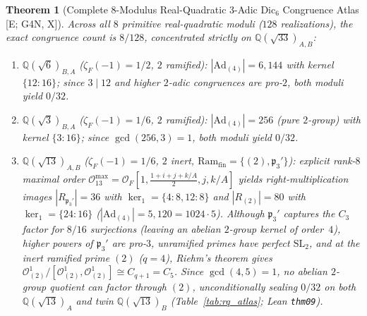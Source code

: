 \documentclass[11pt]{amsart}
\numberwithin{equation}{section}
\theoremstyle{plain}
\newtheorem{theorem}{Theorem}[section]
\theoremstyle{definition}\newtheorem{definition}[theorem]{Definition}
\theoremstyle{remark}\newtheorem{remark}[theorem]{Remark}
\newcommand{\Q}{\mathbb{Q}}
\newcommand{\calO}{\mathcal{O}}
\newcommand{\frp}{\mathfrak{p}}
\newcommand{\SL}{\mathrm{SL}}
\newcommand{\Dic}{\mathrm{Dic}}
\newcommand{\Ad}{\mathrm{Ad}}
\newcommand{\Ram}{\mathrm{Ram}}
\newcommand{\ctag}[1]{\textup{\textsf{\scriptsize[#1]}}}
\begin{document}
\begin{theorem}[Complete $8$-Modulus Real-Quadratic $3$-Adic $\Dic_6$ Congruence Atlas \ctag{E; G4N, X}]\label{thm:rq_atlas}
Across all $8$ primitive real-quadratic moduli ($128$ realizations), the exact congruence count is \textbf{$8/128$}, concentrated strictly on $\Q(\sqrt{33})_{A,B}$:
\begin{enumerate}[label=(\roman*),nosep]
\item $\Q(\sqrt{6})_{B,A}$ ($\zeta_F(-1)=1/2$, $2$ ramified): $|\Ad_{(4)}|=6{,}144$ with kernel $\{12{:}16\}$; since $3 \mid 12$ and higher $2$-adic congruences are pro-$2$, both moduli yield $0/32$.
\item $\Q(\sqrt{3})_{B,A}$ ($\zeta_F(-1)=1/6$, $2$ ramified): $|\Ad_{(4)}|=256$ (pure $2$-group) with kernel $\{3{:}16\}$; since $\gcd(256,3)=1$, both moduli yield $0/32$.
\item $\Q(\sqrt{13})_{A,B}$ ($\zeta_F(-1)=1/6$, $2$ inert, $\Ram_{\mathrm{fin}}=\{(2),\frp_3'\}$): explicit rank-$8$ maximal order $\calO_{13}^{\max} = \calO_F[1, \tfrac{1+i+j+k/A}{2}, j, k/A]$ yields right-multiplication images $|R_{\frp_3'}|=36$ with $\ker_1=\{4{:}8, 12{:}8\}$ and $|R_{(2)}|=80$ with $\ker_1=\{24{:}16\}$ ($|\Ad_{(4)}|=5{,}120=1024\cdot 5$). Although $\frp_3'$ captures the $C_3$ factor for $8/16$ surjections (leaving an abelian $2$-group kernel of order~$4$), higher powers of $\frp_3'$ are pro-$3$, unramified primes have perfect $\SL_2$, and at the inert ramified prime $(2)$ ($q=4$), Riehm's theorem \cite{riehm1970} gives $\calO_{(2)}^1/[\calO_{(2)}^1,\calO_{(2)}^1] \cong C_{q+1} = C_5$. Since $\gcd(4,5)=1$, no abelian $2$-group quotient can factor through $(2)$, unconditionally sealing $0/32$ on both $\Q(\sqrt{13})_A$ and twin $\Q(\sqrt{13})_B$ (Table~\ref{tab:rq_atlas}; Lean \texttt{thm09}).
\end{enumerate}
\end{theorem}
\end{document}
